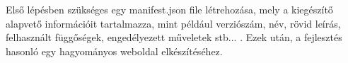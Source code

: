 Első lépésben szükséges egy manifest.json file létrehozása, mely a kiegészítő alapvető információit tartalmazza, mint például verziószám, név, rövid leírás, felhasznált függőségek, engedélyezett műveletek stb... . Ezek után, a fejlesztés hasonló egy hagyományos weboldal elkészítéséhez. 




